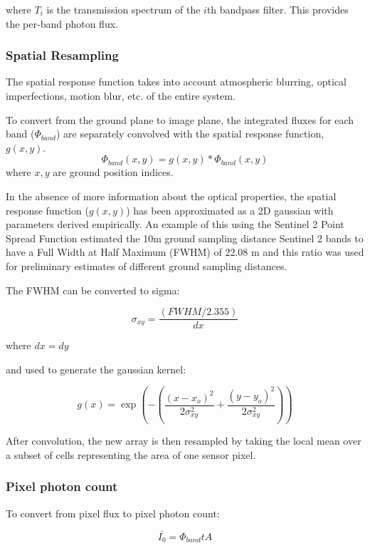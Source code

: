 \documentclass[10pt,a4paper,final,twocolumn]{article}
\begin{document}
where $T_i$ is the transmission spectrum of the $i$th bandpass filter. This provides the per-band photon flux.

\subsubsection{Spatial Resampling}
The spatial response function takes into account atmospheric blurring, optical imperfections, motion blur, etc. of the entire system.

To convert from the ground plane to image plane, the integrated fluxes for each band (${\Phi}_{band}$) are separately convolved with the spatial response function, $g(x,y)$.
\begin{equation}
{\Phi}_{band}(x, y) = g(x, y) * \Phi_{band}(x, y)
\end{equation}
where $x, y$ are ground position indices.

In the absence of more information about the optical properties, the spatial response function ($g(x,y)$) has been approximated as a 2D gaussian with parameters derived empirically. An example of this using the Sentinel 2 Point Spread Function estimated the 10m ground sampling distance Sentinel 2 bands to have a Full Width at Half Maximum (FWHM) of 22.08 m and this ratio was used for preliminary estimates of different ground sampling distances.

The FWHM can be converted to sigma:

\begin{equation}
\sigma_{xy} = \frac{(FWHM/2.355)}{dx}
\end{equation}

where $dx = dy$

and used to generate the gaussian kernel:

\begin{equation}
g(x) =\exp \left(-\left({\frac {(x-x_{o})^{2}}{2\sigma _{xy}^{2}}}+{\frac {(y-y_{o})^{2}}{2\sigma _{xy}^{2}}}\right)\right)
\end{equation}

After convolution, the new array is then resampled by taking the local mean over a subset of cells representing the area of one sensor pixel.

\subsubsection{Pixel photon count}
To convert from pixel flux to pixel photon count:

\begin{equation}
\bar{I_0} =  \Phi_{band} t A
\end{equation}
\end{document}
